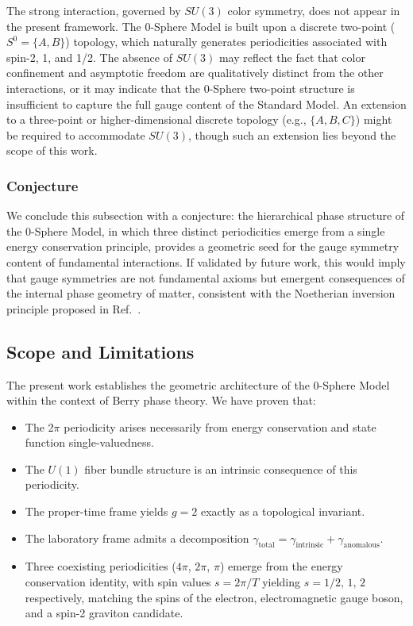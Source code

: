 \documentclass[%
 reprint,
 amsmath,amssymb,
 aps,
 prb,
]{revtex4-2}
\numberwithin{equation}{section}
\theoremstyle{definition}
\theoremstyle{remark}
\newcommand{\Sphere}{S^0}
\newcommand{\Uone}{U(1)}
\begin{document}
The strong interaction, governed by $SU(3)$ color symmetry, does not appear in the present framework. The 0-Sphere Model is built upon a discrete two-point ($\Sphere = \{A, B\}$) topology, which naturally generates periodicities associated with spin-2, 1, and 1/2. The absence of $SU(3)$ may reflect the fact that color confinement and asymptotic freedom are qualitatively distinct from the other interactions, or it may indicate that the 0-Sphere two-point structure is insufficient to capture the full gauge content of the Standard Model. An extension to a three-point or higher-dimensional discrete topology (e.g., $\{A, B, C\}$) might be required to accommodate $SU(3)$, though such an extension lies beyond the scope of this work.

\subsubsection{Conjecture}

We conclude this subsection with a conjecture: the hierarchical phase structure of the 0-Sphere Model, in which three distinct periodicities emerge from a single energy conservation principle, provides a geometric seed for the gauge symmetry content of fundamental interactions. If validated by future work, this would imply that gauge symmetries are not fundamental axioms but emergent consequences of the internal phase geometry of matter, consistent with the Noetherian inversion principle proposed in Ref.~\cite{Hanamura_2025_24}.

\subsection{Scope and Limitations}

The present work establishes the geometric architecture of the 0-Sphere Model within the context of Berry phase theory. We have proven that:
\begin{itemize}
\item The 2$\pi$ periodicity arises necessarily from energy conservation and state function single-valuedness.
\item The $\Uone$ fiber bundle structure is an intrinsic consequence of this periodicity.
\item The proper-time frame yields $g = 2$ exactly as a topological invariant.
\item The laboratory frame admits a decomposition $\gamma_{\text{total}} = \gamma_{\text{intrinsic}} + \gamma_{\text{anomalous}}$.
\item Three coexisting periodicities ($4\pi$, $2\pi$, $\pi$) emerge from the energy conservation identity, with spin values $s = 2\pi/T$ yielding $s = 1/2,\,1,\,2$ respectively, matching the spins of the electron, electromagnetic gauge boson, and a spin-2 graviton candidate.
\end{itemize}
\end{document}
